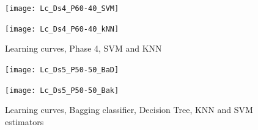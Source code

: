 \documentclass{article}
\begin{document}
\begin{figure}[h]
\vskip 0.2in
\begin{center}
\centerline{\texttt{[image: Lc\_Ds4\_P60-40\_SVM]}}
\centerline{\texttt{[image: Lc\_Ds4\_P60-40\_kNN]}}
\caption{Learning curves, Phase 4, SVM and KNN}
\label{learning curves}
\end{center}
\vskip -0.2in
\end{figure} 

\begin{figure}[h]
\vskip 0.2in
\begin{center}
\centerline{\texttt{[image: Lc\_Ds5\_P50-50\_BaD]}}
\centerline{\texttt{[image: Lc\_Ds5\_P50-50\_Bak]}}
\caption{Learning curves, Bagging classifier, Decision Tree, KNN and SVM estimators}
\label{learning curves}
\end{center}
\vskip -0.2in
\end{figure}
\end{document}
